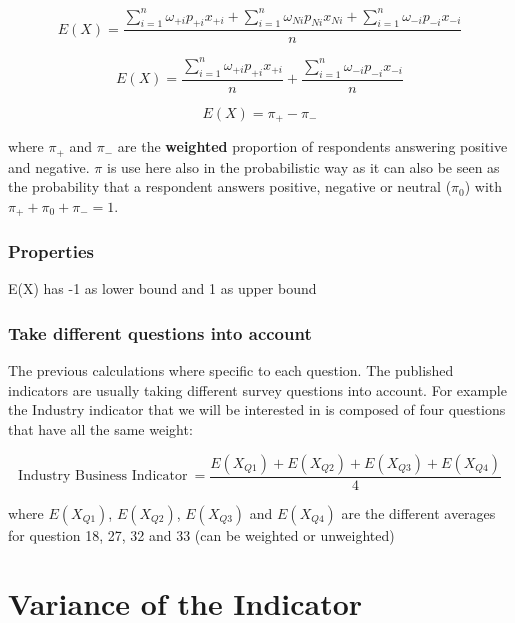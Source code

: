 \documentclass[12pt,a4paper,oneside]{book}
\begin{document}
\begin{equation}
    E(X) = \frac{ \sum_{i=1}^n \omega_{+i} p_{+i} x_{+i} + \sum_{i=1}^n \omega_{Ni} p_{Ni} x_{Ni} + \sum_{i=1}^n \omega_{-i} p_{-i} x_{-i}}{n}
\end{equation} 

\begin{equation}
    E(X) = \frac{ \sum_{i=1}^n \omega_{+i} p_{+i} x_{+i}}{n} + \frac{\sum_{i=1}^n \omega_{-i} p_{-i} x_{-i}}{n}
\end{equation} 


\begin{equation}
    E(X) = \pi_+ - \pi_-
\end{equation}

where $\pi_+$ and $\pi_-$ are the \textbf{weighted} proportion of respondents answering positive and negative. $\pi$ is use here also in the probabilistic way as it can also be seen as the probability that a respondent answers positive, negative or neutral ($\pi_0$) with $\pi_+ + \pi_0 + \pi_- =1$.




\subsection{Properties}

E(X) has -1 as lower bound and 1 as upper bound






\subsection{Take different questions into account}

The previous calculations where specific to each question. The published indicators are usually taking different survey questions into account. For example the Industry indicator that we will be interested in is composed of four questions that have all the same weight:

\begin{equation}
    \mbox{Industry Business Indicator}\ = \frac{E(X_{Q1}) + E(X_{Q2}) + E(X_{Q3}) + E(X_{Q4})}{4}
\end{equation}

where 
$E(X_{Q1})$, $E(X_{Q2})$, $E(X_{Q3})$ and $E(X_{Q4})$ are the different averages for question 18, 27, 32 and 33 (can be weighted or unweighted)


\chapter{Variance of the Indicator}
\end{document}
